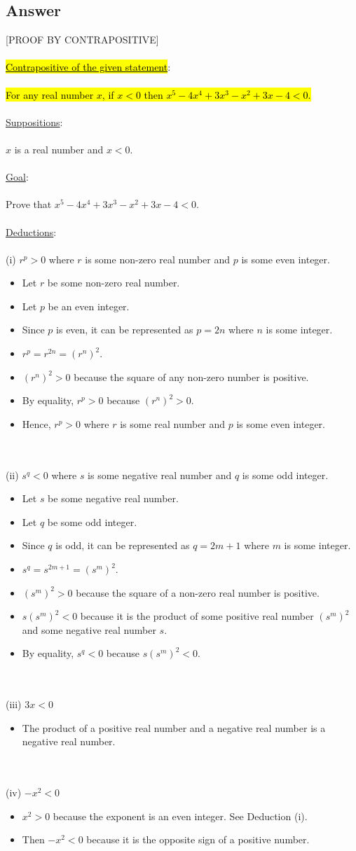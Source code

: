 \documentclass[12pt]{article}
\newcommand{\xlist}[1]{
    \begin{itemize}
        \renewcommand{\labelitemi}{$\centerdot$}
        #1
    \end{itemize}
    \newblock
    \\ \\
}
\newcommand{\xsupposition}[1]{
    \underline{Suppositions}:
    \\ \\
    #1
    \\ \\
}
\newcommand{\xgoal}[1]{
    \underline{Goal}:
    \\ \\
    #1
    \\ \\
}
\newcommand{\xdeductions}{
    \underline{Deductions}:
    \\ \\
}
\begin{document}
\subsection*{Answer}
[PROOF BY CONTRAPOSITIVE] \\ \\
\underline{\hl{Contrapositive of the given statement}}:
\\ \\
\hl{For any real number $x$, if $x<0$ then $x^5 - 4x^4 + 3x^3 - x^2 + 3x - 4 < 0$.}
\\ \\
\xsupposition{$x$ is a real number and $x < 0$.}
\xgoal{Prove that $x^5 - 4x^4 + 3x^3 - x^2 + 3x - 4 < 0$.}
\xdeductions
(i) $r^p > 0$ where $r$ is some non-zero real number and $p$ is some even integer.
\xlist{
  \item Let $r$ be some non-zero real number.
  \item Let $p$ be an even integer.
  \item Since $p$ is even, it can be represented as $p=2n$ where $n$ is some integer.
  \item $r^p = r^{2n} = (r^n)^2$.
  \item $(r^n)^2 > 0$ because the square of any non-zero number is positive.
  \item By equality, $r^p > 0$ because $(r^n)^2 > 0$.
  \item Hence, $r^p > 0$ where $r$ is some real number and $p$ is some even integer.
}
(ii) $s^q < 0$ where $s$ is some negative real number and $q$ is some odd integer.
\xlist{
    \item Let $s$ be some negative real number.
    \item Let $q$ be some odd integer.
    \item Since $q$ is odd, it can be represented as $q=2m + 1$ where $m$ is some integer.
    \item $s^q = s^{2m + 1} = (s^m)^2$.
    \item $(s^m)^2 > 0$ because the square of a non-zero real number is positive.
    \item $s(s^m)^2 < 0$ because it is the product of some positive real number $(s^m)^2$ and some negative real number $s$.
    \item By equality, $s^q < 0$ because $s(s^m)^2 < 0$.
}
(iii) $3x < 0$
\xlist{
  \item The product of a positive real number and a negative real number is a negative real number.
}
(iv) $-x^2 < 0$
\xlist{
  \item $x^2 > 0$ because the exponent is an even integer. See Deduction (i).
  \item Then $-x^2 < 0$ because it is the opposite sign of a positive number.
}
\end{document}
